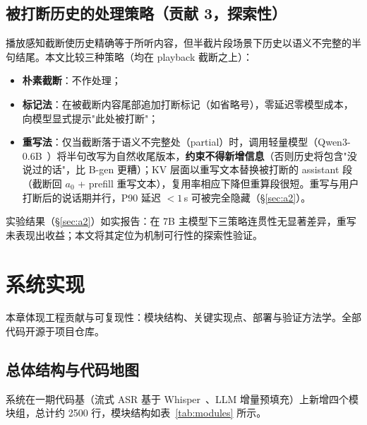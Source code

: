 \documentclass[conference]{IEEEtran}
\theoremstyle{definition}
\begin{document}
\subsection{被打断历史的处理策略（贡献 3，探索性）}\label{sec:hist}
播放感知截断使历史精确等于所听内容，但半截片段场景下历史以语义不完整的半句结尾。本文比较三种策略（均在 playback 截断之上）：
\begin{itemize}
  \item \textbf{朴素截断}：不作处理；
  \item \textbf{标记法}：在被截断内容尾部追加打断标记（如省略号），零延迟零模型成本，向模型显式提示"此处被打断"；
  \item \textbf{重写法}：仅当截断落于语义不完整处（partial）时，调用轻量模型（Qwen3-0.6B~\cite{qwen3}）将半句改写为自然收尾版本，\textbf{约束不得新增信息}（否则历史将包含"没说过的话"，比 B-gen 更糟）；KV 层面以重写文本替换被打断的 assistant 段（截断回 $a_0$ + prefill 重写文本），复用率相应下降但重算段很短。重写与用户打断后的说话期并行，P90 延迟 $<1$\,s 可被完全隐藏（\S\ref{sec:a2}）。
\end{itemize}
实验结果（\S\ref{sec:a2}）如实报告：在 7B 主模型下三策略连贯性无显著差异，重写未表现出收益；本文将其定位为机制可行性的探索性验证。

\section{系统实现}\label{sec:impl}
本章体现工程贡献与可复现性：模块结构、关键实现点、部署与验证方法学。全部代码开源于项目仓库。

\subsection{总体结构与代码地图}
系统在一期代码基（流式 ASR 基于 Whisper~\cite{whisper}、LLM 增量预填充）上新增四个模块组，总计约 2500 行，模块结构如表~\ref{tab:modules} 所示。
\end{document}
